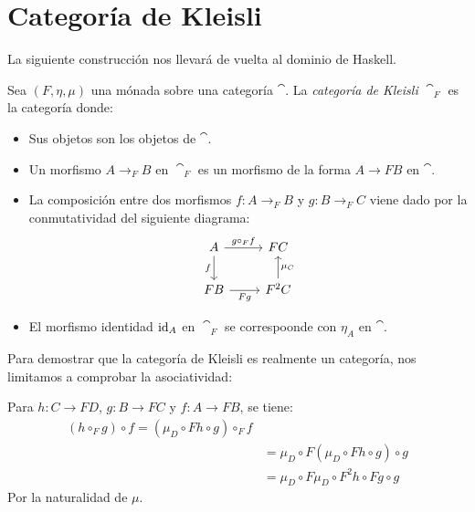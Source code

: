 \section{Categoría de Kleisli}
La siguiente construcción nos llevará de vuelta al dominio de Haskell.
\begin{definition}
Sea $(F,\eta,\mu)$ una mónada sobre una categoría $\cat$.
La \emph{categoría de Kleisli} $\cat_F$ es la categoría donde:
\begin{itemize}
  \item Sus objetos son los objetos de $\cat$.
  \item Un morfismo $A \to_F B$ en $\cat_F$ es un morfismo de la forma $A \to F B$ en $\cat$.
  \item La composición entre dos morfismos $f \colon A \to_F B$ y $g \colon B \to_F C$ viene dado por la conmutatividad del siguiente diagrama:
  \[ \begin{tikzcd}
  A \arrow[r,"g \circ_F f"] \arrow[d,"f" left] & {F C}\\
  {F B} \arrow[r,"F g" below] & F^2 C \arrow[u,"\mu_C" right]
  \end{tikzcd}\]
  \item El morfismo identidad $\operatorname{id}_A$ en $\cat_F$ se correspoonde con $\eta_A$ en $\cat$.
\end{itemize}
\end{definition}
Para demostrar que la categoría de Kleisli es realmente un categoría, nos limitamos a comprobar la asociatividad:

Para $h \colon C \to F D$, $g \colon B \to F C$ y $f \colon A \to F B$, se tiene:
\begin{align*}
(h \circ_F g) \circ f = (\mu_D \circ F h \circ g) \circ_F f\\
& = \mu_D \circ F(\mu_D \circ F h \circ g)\circ g\\
& = \mu_D \circ F\mu_D \circ F^2 h \circ F g \circ g
\end{align*}
Por la naturalidad de $\mu$.

